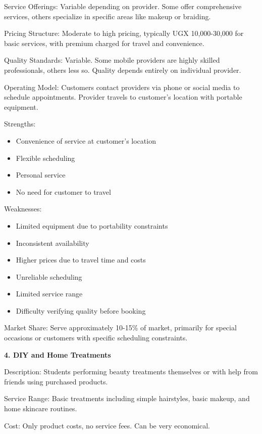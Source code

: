 Service Offerings: Variable depending on provider. Some offer comprehensive services, others specialize in specific areas like makeup or braiding.

Pricing Structure: Moderate to high pricing, typically UGX 10,000-30,000 for basic services, with premium charged for travel and convenience.

Quality Standards: Variable. Some mobile providers are highly skilled professionals, others less so. Quality depends entirely on individual provider.

Operating Model: Customers contact providers via phone or social media to schedule appointments. Provider travels to customer's location with portable equipment.

Strengths:
\begin{itemize}[leftmargin=2em]
    \item Convenience of service at customer's location
    \item Flexible scheduling
    \item Personal service
    \item No need for customer to travel
\end{itemize}

Weaknesses:
\begin{itemize}[leftmargin=2em]
    \item Limited equipment due to portability constraints
    \item Inconsistent availability
    \item Higher prices due to travel time and costs
    \item Unreliable scheduling
    \item Limited service range
    \item Difficulty verifying quality before booking
\end{itemize}

Market Share: Serve approximately 10-15\% of market, primarily for special occasions or customers with specific scheduling constraints.

\textbf{4. DIY and Home Treatments}

Description: Students performing beauty treatments themselves or with help from friends using purchased products.

Service Range: Basic treatments including simple hairstyles, basic makeup, and home skincare routines.

Cost: Only product costs, no service fees. Can be very economical.

